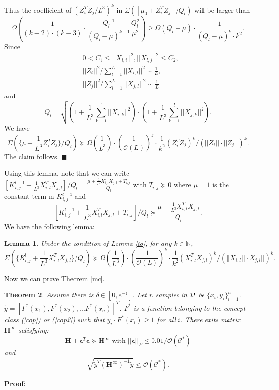 \documentclass{article}
\newcommand{\cO}{\mathcal{O}}
\newtheorem{theo}{\textbf{Theorem}}
\newtheorem{lem}[theo]{\textbf{Lemma}}
\newcommand*{\QEDA}{\hfill\ensuremath{\blacksquare}}%
\newcommand{\dataset}{{\cal D}}
\begin{document}
Thus  the coefficient of $(Z_{i}^TZ_{j}/L^3)^{k}$ in $\Sigma([\mu_0+Z_{i}^TZ_{j} ]/Q_l)$ will be larger than
$$ \Omega(\frac{1}{ (k-2)\cdot (k-3)}\cdot \frac{Q_l^{-1}}{(Q_l-\mu)^{k-1}} \frac{Q_l^2}{\mu^2})\geq \Omega(Q_l-\mu)\cdot  \frac{1}{(Q_l-\mu)^{k}\cdot k^2}.$$
Since
\begin{equation}
\begin{aligned}
&0<C_1\leq ||X_{l,i}||^2, ||X_{l,j}||^2\leq  C_2,\\
& ||Z_i||^2/\sum_{l=1} ^L ||X_{i, l}||^2\sim \frac{1}{L},\\
& ||Z_j||^2/\sum_{l=1} ^L ||X_{j, l}||^2\sim \frac{1}{L}
\end{aligned}
\end{equation}
and
\begin{equation}
Q_l=\sqrt{(1+\frac{1}{L^3}\sum_{k=1}^l||X_{i,k}||^2)\cdot(1+\frac{1}{L^3}\sum_{k=1}^l||X_{j,k}||^2) }.
\end{equation}
We have
\begin{equation}
\Sigma(\{\mu+\frac{1}{L^3}Z_{i}^TZ_{j}\}/Q_{l})\succeq  \Omega( \frac{1}{L^3}) \cdot (\frac{1}{\cO(L)})^{k}\cdot \frac{1}{k^2} (Z_{i}^TZ_{j})^{k}/(||Z_{i}||\cdot ||Z_{j}||)^{k}.
\end{equation}
The claim follows.
\QEDA


Using this lemma, note that  we can write $[K^{l-1}_{i,j}+\frac{1}{L^3}X_{i,l}^TX_{j,l}]/Q_l = \frac{\mu+\frac{1}{L^3}X_{i,l}^TX_{j,l} +T_{i,j}}{Q_l}$ with $T_{i,j} \succeq 0$ where $\mu= 1$ is the constant term in $K^{l-1}_{i,j}$ and
$$[K^{l-1}_{i,j}+\frac{1}{L^3}X_{i,l}^TX_{j,l}+ T_{i,j}]/Q_l \succeq \frac{\mu+\frac{1}{L^3}X_{i,l}^TX_{j,l}}{Q_l}.$$
We have the following lemma:
\begin{lem}\label{2ch}
Under the condition of Lemma \ref{io}, for any $k\in \mathbb{N}$,
\begin{equation}
\Sigma(\{K^{l}_{i,j}+\frac{1}{L^3}X_{i,l}^TX_{j,l}\}/Q_{l})\succeq  \Omega( \frac{1}{L^3}) \cdot (\frac{1}{\cO(L)})^{k}\cdot \frac{1}{k^2} (X_{i,l}^TX_{j,l})^{k}/(||X_{i,l}||\cdot X_{j,l}||)^{k}.
\end{equation}
\end{lem}

Now we can prove Theorem \ref{mc}.
\begin{theo}\label{tlast}
Assume there is $\delta\in [0,e^{-1}]$. Let $n$ samples in $\dataset$  be $\{x_i,y_i\}_{i=1}^n$. $\widetilde{y}=[F^*(x_1),F^*(x_2),...F^*(x_n)]^T$. $F^*$ is a function belonging to the concept class (\ref{cop}) or (\ref{cop2}) such that $y_i\cdot F^*(x_i)\geq 1$ for all $i$.  There exits matrix $\bm{H}^\infty$ satisfying:
\begin{equation}
\bm{H} +\bm{\epsilon}^T\bm{\epsilon} \succeq \bm{H}^\infty \text{ with } ||\bm{\epsilon}||_F\leq 0.01/ \cO(\mathscr{C}^*)
\end{equation}
and
\begin{equation}
\sqrt{ \widetilde{y}^T (\bm{H}^\infty)^{-1}\widetilde{y}}\leq \cO(\mathscr{C}^*).
\end{equation}
\end{theo}
{\bf Proof:}
\end{document}

